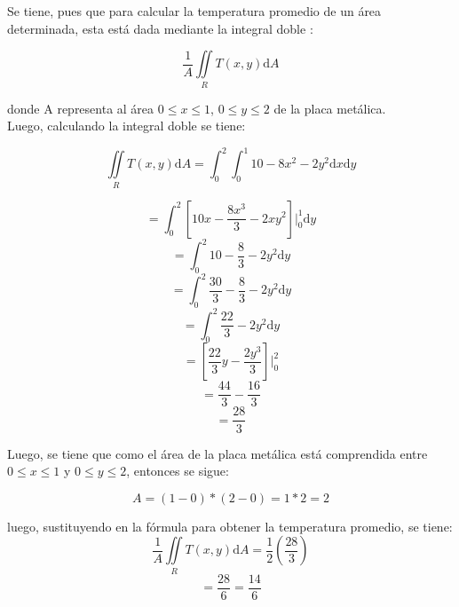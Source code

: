\documentclass[a4paper,12pt]{article}
\begin{document}
	Se tiene, pues que para calcular la temperatura promedio de un área
	determinada, esta está dada mediante la integral doble :

		$$ \frac{1}{A}  \iint\limits_{R} T(x,y)\mathrm{d}A   $$

	donde A representa al área $ 0 \leq x \leq 1$, $ 0 \leq y \leq 2 $ de la
	placa metálica.\\

	Luego, calculando la integral doble se tiene:

		$$ \iint\limits_{R} T(x,y)\mathrm{d}A  =
			\int_{0}^{2} \int_{0}^{1} 10 - 8x^2 - 2y^2 \mathrm{d}x \mathrm{d}y   $$

		$$ = \int_{0}^{2} [ 10x - \frac{8x^3}{3} - 2xy^2 ] \Big|_0^1 \mathrm{d}y $$
		$$ = \int_{0}^{2} 10 - \frac{8}{3} - 2y^2  \mathrm{d}y $$
		$$ = \int_{0}^{2} \frac{30}{3} - \frac{8}{3} - 2y^2 \mathrm{d}y $$
		$$ = \int_{0}^{2} \frac{22}{3} - 2y^2 \mathrm{d}y $$
		$$ = [ \frac{22}{3}y - \frac{2y^3}{3} ] \Big|_0^2$$
		$$ = \frac{44}{3} - \frac{16}{3} $$
		$$ = \frac{28}{3} $$

	Luego, se tiene que como el área de la placa metálica está comprendida entre
	$ 0 \leq x \leq 1 $ y $ 0 \leq y \leq 2 $, entonces se sigue:

	 	$$ A = (1 - 0) * (2 - 0) = 1 * 2 = 2  $$

	luego, sustituyendo en la fórmula para obtener la temperatura promedio, se
	tiene:
		$$ \frac{1}{A}  \iint\limits_{R} T(x,y)\mathrm{d}A  = \frac{1}{2} (\frac{28}{3}) $$
		$$ = \frac{28}{6} = \frac{14}{6} $$
\end{document}
